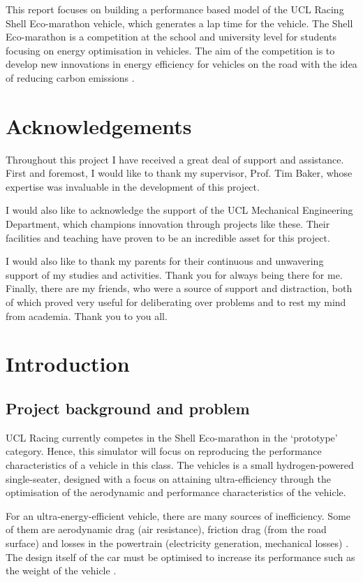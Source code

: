 \documentclass[11pt]{article}
\numberwithin{equation}{section}
\begin{document}
This report focuses on building a performance based model of the UCL Racing Shell Eco-marathon vehicle, which generates a lap time for the vehicle. The Shell Eco-marathon is a competition at the school and university level for students focusing on energy optimisation in vehicles. The aim of the competition is to develop new innovations in energy efficiency for vehicles on the road with the idea of reducing carbon emissions \citep{shell1}.
\section*{Acknowledgements}
Throughout this project I have received a great deal of support and assistance. First and foremost, I would like to thank my supervisor, Prof. Tim Baker, whose expertise was invaluable in the development of this project. 

I would also like to acknowledge the support of the UCL Mechanical Engineering Department, which champions innovation through projects like these. Their facilities and teaching have proven to be an incredible asset for this project. 

I would also like to thank my parents for their continuous and unwavering support of my studies and activities. Thank you for always being there for me. Finally, there are my friends, who were a source of support and distraction, both of which proved very useful for deliberating over problems and to rest my mind from academia. Thank you to you all.
\newpage
\tableofcontents
\listoffigures
\listoftables
\newpage
\section{Introduction}
\subsection{Project background and problem}
UCL Racing currently competes in the Shell Eco-marathon in the `prototype' category. Hence, this simulator will focus on reproducing the performance characteristics of a vehicle in this class. The vehicles is a small hydrogen-powered single-seater, designed with a focus on attaining ultra-efficiency through the optimisation of the aerodynamic and performance characteristics of the vehicle.

For an ultra-energy-efficient vehicle, there are many sources of inefficiency. Some of them are aerodynamic drag (air resistance), friction drag (from the road surface) and losses in the powertrain (electricity generation, mechanical losses) \citep{Wei2019}. The design itself of the car must be optimised to increase its performance such as the weight of the vehicle \citep{Tsirogiannis2019}.
\end{document}
